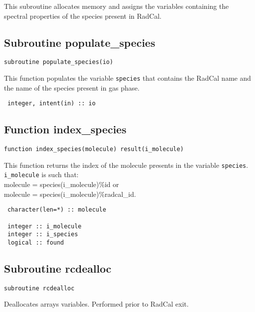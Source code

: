 \begin{lstlisting}

\end{lstlisting}

This subroutine allocates memory and assigns the variables containing the spectral properties of the species present in RadCal.

\subsection{Subroutine populate\_species}
\label{sub:populate_species}

\begin{lstlisting}
subroutine populate_species(io)
\end{lstlisting}
 This function populates the variable \verb=species= that contains the RadCal name and the name of the species present in gas phase.

\begin{lstlisting}
 integer, intent(in) :: io
\end{lstlisting}


\subsection{Function index\_species}
\label{fun:index_species}

\begin{lstlisting}
function index_species(molecule) result(i_molecule)
\end{lstlisting}

This function returns the index of the molecule presents in the variable \verb=species=.
\verb=i_molecule= is such that:\\
 molecule = species(i\_molecule)\%id or\\
 molecule = species(i\_molecule)\%radcal\_id.

\begin{lstlisting}
 character(len=*) :: molecule

 integer :: i_molecule
 integer :: i_species
 logical :: found

\end{lstlisting}


\subsection{Subroutine rcdealloc}

\begin{lstlisting}
subroutine rcdealloc
\end{lstlisting}
Deallocates arrays variables. Performed prior to RadCal exit.

